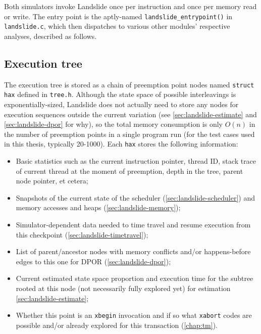 Both simulators invoke Landslide once per instruction and once per memory read or write.
The entry point is the aptly-named {\tt landslide\_entrypoint()} in {\tt landslide.c},
which then dispatches to various other modules' respective analyses, described as follows.


\subsection{Execution tree}
\label{sec:landslide-save}

The execution tree
is stored as a chain of preemption point nodes named {\tt struct hax} defined in {\tt tree.h}.
Although the state space of possible interleavings is exponentially-sized,
Landslide does not actually need to store any nodes for execution sequences outside the current variation
(see \cref{sec:landslide-estimate} and \cref{sec:landslide-dpor} for why),
so the total memory consumption is only $O(n)$ in the number of preemption points in a single program run
(for the test cases used in this thesis, typically 20-1000).
Each {\tt hax} stores the following information:

\begin{itemize}
	\item Basic statistics such as the current instruction pointer, thread ID,
		stack trace of current thread at the moment of preemption,
		depth in the tree, parent node pointer, et cetera;
	\item Snapshots of the current state of the scheduler (\cref{sec:landslide-scheduler})
		and memory accesses and heaps (\cref{sec:landslide-memory});
	\item Simulator-dependent data needed to time travel and resume execution
		from this checkpoint (\cref{sec:landslide-timetravel});
	\item List of parent/ancestor nodes with memory conflicts and/or happens-before edges to this one
		for DPOR (\cref{sec:landslide-dpor});
	\item Current estimated state space proportion and execution time for the subtree rooted at this node
		(not necessarily fully explored yet) for estimation \cref{sec:landslide-estimate};
	\item Whether this point is an {\tt xbegin} invocation
		and if so what {\tt xabort} codes are possible and/or already explored for this transaction
		(\cref{chap:tm}).
\end{itemize}


